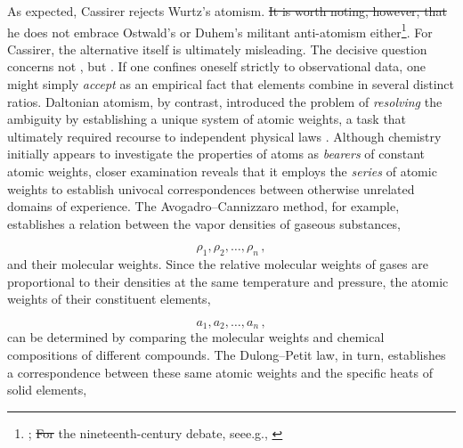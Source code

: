 \documentclass[submitted,12pt]{article}
\providecommand{\DIFadd}[1]{{\protect\color{blue}\uwave{#1}}} %
\providecommand{\DIFdel}[1]{{\protect\color{red}\sout{#1}}}                      %
\providecommand{\DIFaddbegin}{} %
\providecommand{\DIFaddend}{} %
\providecommand{\DIFdelbegin}{} %
\providecommand{\DIFdelend}{} %
\begin{document}
As expected, Cassirer rejects Wurtz's  atomism. \DIFdelbegin \DIFdel{It is worth noting, however, that }\DIFdelend \DIFaddbegin \DIFadd{However, }\DIFaddend he does not embrace Ostwald's or Duhem's militant anti-atomism either\footnote{\cite{Needham2008}; \DIFdelbegin \DIFdel{For }\DIFdelend \DIFaddbegin \DIFadd{for }\DIFaddend the nineteenth-century debate, see\DIFaddbegin \DIFadd{, }\DIFaddend e.g., \citet{Rocke1984}\DIFaddbegin \DIFadd{.}\DIFaddend }. For Cassirer, the alternative itself is ultimately misleading. The decisive question concerns not , but  . If one confines oneself strictly to observational data, one might simply \emph{accept} as an empirical fact that elements combine in several distinct ratios. Daltonian atomism, by contrast, introduced the problem of \emph{resolving} the ambiguity by establishing a unique system of atomic weights, a task that ultimately required recourse to independent physical laws \cite[see][lect.~IV]{Ladenburg1902}. Although chemistry initially appears to investigate the properties of atoms as \emph{bearers} of constant atomic weights, closer examination reveals that it employs the \emph{series} of atomic weights to establish univocal correspondences between otherwise unrelated domains of experience. The Avogadro--Cannizzaro method, for example, establishes a relation between the vapor densities of gaseous substances,


\begin{equation*}
\rho_1, \rho_2, \ldots, \rho_n\,,
\end{equation*}
%
and their molecular weights. Since the relative molecular weights of gases are proportional to their densities at the same temperature and pressure, the atomic weights of their constituent elements,

\begin{equation*}
a_1, a_2, \ldots, a_n\,,
\end{equation*}
%
can be determined by comparing the molecular weights and chemical compositions of different compounds. The Dulong--Petit law, in turn, establishes a correspondence between these same atomic weights and the specific heats of solid elements,
\end{document}
